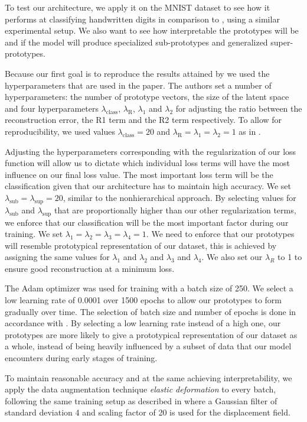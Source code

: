 To test our architecture, we apply it on the MNIST dataset to see how it performs at classifying handwritten digits in comparison to \cite{li2018deep}, using a similar experimental setup. We also want to see how interpretable the prototypes will be and if the model will produce specialized sub-prototypes and generalized super-prototypes.

Because our first goal is to reproduce the results attained by  \cite{li2018deep} we used the hyperparameters that are used in the paper. The authors set a number of hyperparameters: the number of prototype vectors, the size of the latent space and four hyperparameters $\lambda_{\text{class}}$, $\lambda_{\text{R}}$, $\lambda_1$ and $\lambda_2$ for adjusting the ratio between the reconstruction error, the R1 term and the R2 term respectively. To allow for reproducibility, we used values $\lambda_{\text{class}}=20$ and $\lambda_{\text{R}}=\lambda_1=\lambda_2=1$ as in  \cite{li2018deep}.

Adjusting the hyperparameters corresponding with the regularization of our loss function will allow us to dictate which individual loss terms will have the most influence on our final loss value. The most important loss term will be the classification given that our architecture has to maintain high accuracy. We set $\lambda_{\text{sub}}=\lambda_{\text{sup}}=20$, similar to the nonhierarchical approach. By selecting values for $\lambda_{\text{sub}}$ and $\lambda_{\text{sup}}$ that are proportionally higher than our other regularization terms, we enforce that our classification will be the most important factor during our training. We set $\lambda_{1}=\lambda_{2}=\lambda_{3}=\lambda_{4}=1$. We need to enforce that our prototypes will resemble prototypical representation of our dataset, this is achieved by assigning the same values for $\lambda_{1}$ and $\lambda_{2}$ and $\lambda_{3}$ and $\lambda_{4}$. We also set our $\lambda_{R}$ to 1 to ensure good reconstruction at a minimum loss. 

The Adam optimizer \cite{adam} was used for training with a batch size of 250. We select a low learning rate of 0.0001 over 1500 epochs to allow our prototypes to form gradually over time. The selection of batch size and number of epochs is done in accordance with \cite{li2018deep}. By selecting a low learning rate instead of a high one, our prototypes are more likely to give a prototypical representation of our dataset as a whole, instead of being heavily influenced by a subset of data that our model encounters during early stages of training. 


To maintain reasonable accuracy and at the same achieving interpretability, we apply the data augmentation technique \textit{elastic deformation}\citep{elasticdeformation} to every batch, following the same training setup as described in \citep{li2018deep} where a Gaussian filter of standard deviation 4 and scaling factor of 20 is used for the displacement field. 